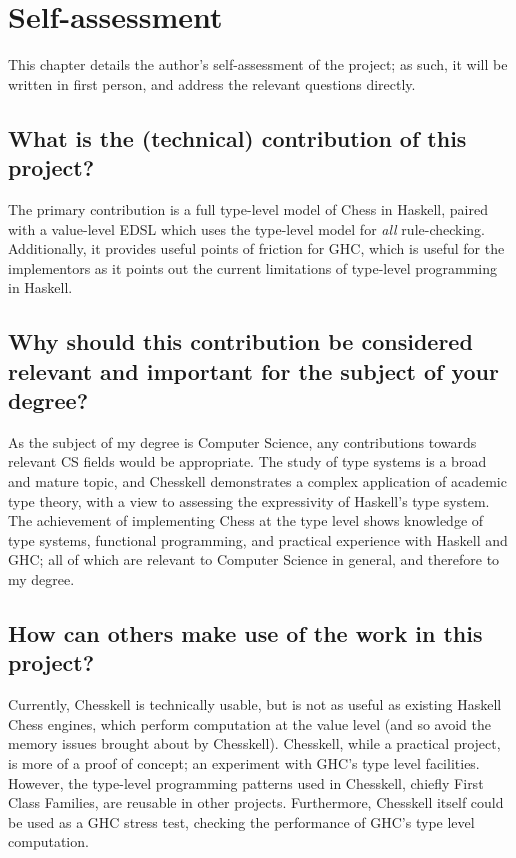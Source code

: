 \chapter{Self-assessment}

This chapter details the author's self-assessment of the project; as such, it will be written in first person, and address the relevant questions directly.

\section{What is the (technical) contribution of this project?}

The primary contribution is a full type-level model of Chess in Haskell, paired with a value-level EDSL which uses the type-level model for \emph{all} rule-checking. Additionally, it provides useful points of friction for GHC, which is useful for the implementors as it points out the current limitations of type-level programming in Haskell.


\section{Why should this contribution be considered relevant and important for the subject of your degree?}

As the subject of my degree is Computer Science, any contributions towards relevant CS fields would be appropriate. The study of type systems is a broad and mature topic, and Chesskell demonstrates a complex application of academic type theory, with a view to assessing the expressivity of Haskell's type system. The achievement of implementing Chess at the type level shows knowledge of type systems, functional programming, and practical experience with Haskell and GHC; all of which are relevant to Computer Science in general, and therefore to my degree.

\section{How can others make use of the work in this project?}

Currently, Chesskell is technically usable, but is not as useful as existing Haskell Chess engines, which perform computation at the value level (and so avoid the memory issues brought about by Chesskell). Chesskell, while a practical project, is more of a proof of concept; an experiment with GHC's type level facilities. However, the type-level programming patterns used in Chesskell, chiefly First Class Families, are reusable in other projects. Furthermore, Chesskell itself could be used as a GHC stress test, checking the performance of GHC's type level computation.

